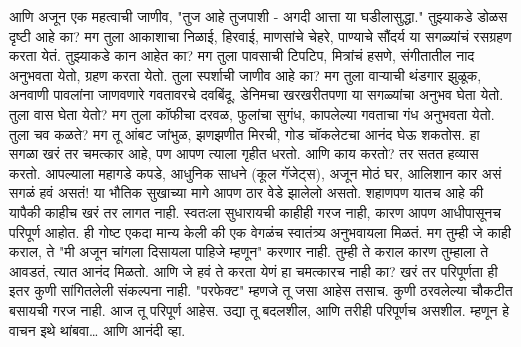 आणि अजून एक महत्वाची जाणीव,  "तुज आहे तुजपाशी - अगदी आत्ता या घडीलासुद्धा."
तुझ्याकडे डोळस दृष्टी आहे का? मग तुला आकाशाचा निळाई, हिरवाई, माणसांचे चेहरे, पाण्याचे सौंदर्य या सगळ्यांचं रसग्रहण करता येतं. तुझ्याकडे कान आहेत का? मग तुला पावसाची टिपटिप, मित्रांचं हसणे, संगीतातील नाद अनुभवता येतो, ग्रहण करता येतो. तुला स्पर्शाची जाणीव आहे का? मग तुला वाऱ्याची थंडगार झुळूक, अनवाणी पावलांना जाणवणारे गवतावरचे दवबिंदू, डेनिमचा खरखरीतपणा या सगळ्यांचा अनुभव घेता येतो. तुला वास घेता येतो? मग तुला कॉफीचा दरवळ, फुलांचा सुगंध, कापलेल्या गवताचा गंध अनुभवता येतो. तुला चव कळते? मग तू आंबट जांभुळ, झणझणीत मिरची, गोड चॉकलेटचा आनंद घेऊ शकतोस.
हा सगळा खरं तर चमत्कार आहे, पण आपण त्याला गृहीत धरतो. आणि काय करतो? तर सतत हव्यास करतो.   आपल्याला महागडे कपडे, आधुनिक साधने (कूल गॅजेट्स), अजून मोठं घर, आलिशान कार असं सगळं हवं असतं! या भौतिक सुखाच्या मागे आपण ठार वेडे झालेलो असतो.
शहाणपण यातच आहे की यापैकी काहीच खरं तर लागत नाही. स्वतःला सुधारायची काहीही गरज नाही, कारण आपण आधीपासूनच परिपूर्ण आहोत.
ही गोष्ट एकदा मान्य केली की एक वेगळंच स्वातंत्र्य अनुभवायला मिळतं.
मग तुम्ही जे काही कराल, ते "मी अजून चांगला दिसायला पाहिजे म्हणून" करणार नाही. तुम्ही ते कराल कारण तुम्हाला ते आवडतं, त्यात आनंद मिळतो. आणि जे हवं ते करता येणं हा चमत्कारच नाही का?
खरं तर परिपूर्णता ही इतर कुणी सांगितलेली संकल्पना नाही. "परफेक्ट" म्हणजे तू जसा आहेस तसाच. कुणी ठरवलेल्या चौकटीत बसायची गरज नाही.
आज तू परिपूर्ण आहेस. उद्या तू बदलशील, आणि तरीही परिपूर्णच असशील.
म्हणून हे वाचन इथे थांबवा… आणि आनंदी व्हा.

